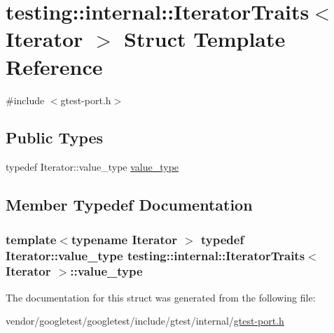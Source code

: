 \hypertarget{structtesting_1_1internal_1_1IteratorTraits}{}\section{testing\+:\+:internal\+:\+:Iterator\+Traits$<$ Iterator $>$ Struct Template Reference}
\label{structtesting_1_1internal_1_1IteratorTraits}


{\ttfamily \#include $<$gtest-\/port.\+h$>$}

\subsection*{Public Types}
\begin{DoxyCompactItemize}
\item 
typedef Iterator\+::value\+\_\+type \hyperlink{structtesting_1_1internal_1_1IteratorTraits_a29de4320a9c53ce438d3561b94e515bb}{value\+\_\+type}
\end{DoxyCompactItemize}


\subsection{Member Typedef Documentation}
\subsubsection[{\texorpdfstring{value\+\_\+type}{value_type}}]{\setlength{\rightskip}{0pt plus 5cm}template$<$typename Iterator $>$ typedef Iterator\+::value\+\_\+type {\bf testing\+::internal\+::\+Iterator\+Traits}$<$ Iterator $>$\+::{\bf value\+\_\+type}}\hypertarget{structtesting_1_1internal_1_1IteratorTraits_a29de4320a9c53ce438d3561b94e515bb}{}\label{structtesting_1_1internal_1_1IteratorTraits_a29de4320a9c53ce438d3561b94e515bb}


The documentation for this struct was generated from the following file\+:\begin{DoxyCompactItemize}
\item 
vendor/googletest/googletest/include/gtest/internal/\hyperlink{gtest-port_8h}{gtest-\/port.\+h}\end{DoxyCompactItemize}

